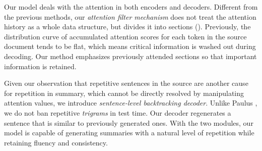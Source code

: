 Our model deals with the attention in both encoders and decoders. 
Different from the previous methods, 
our \textit{attention filter mechanism} does not 
treat the attention history as a whole data structure,  
but divides it into sections (). 
Previously, the distribution curve of accumulated attention scores 
for each token in the source document tends to be flat, 
which means critical information is washed out during decoding.
Our method emphasizes previously attended sections 
so that 
important information is retained.

Given our observation that repetitive sentences in the source are
another cause for repetition in summary, 
which cannot be directly resolved by manipulating attention values, 
we introduce \textit{sentence-level backtracking decoder}. 
Unlike Paulus \cite{PaulusXS17}, 
we do not ban repetitive \textit{trigrams} in test time. 
Our decoder regenerates a sentence that is similar to previously generated ones.
With the two modules, our model is capable of generating summaries with a
natural level of repetition while retaining fluency and consistency.
